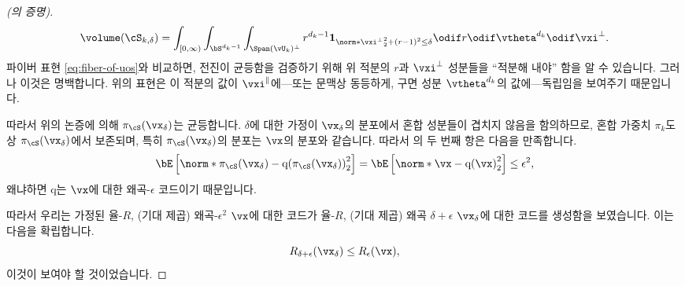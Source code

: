 \documentclass[../../book-main_ko.tex]{subfiles}
\begin{document}
\begin{proof}[(의 증명)]
    \begin{equation}
        \volume(\cS_{k, \delta})
        = \int_{[0, \infty)} \int_{\bS^{d_k-1}} \int_{\Span(\vU_k)^\perp}
        r^{d_k-1}
        \mathbf{1}_{
            \norm*{\vxi^{\perp}}_2^2
            + \left( r - 1 \right)^2
            \leq
            \delta
        }
        \odif r \odif \vtheta^{d_k} \odif \vxi^{\perp}.
    \end{equation}
    파이버 표현 \eqref{eq:fiber-of-uos}와 비교하면, 전진이 균등함을 검증하기 위해 위 적분의 \(r\)과 \(\vxi^\perp\) 성분들을 ``적분해 내야'' 함을 알 수 있습니다.
    그러나 이것은 명백합니다. 위의 표현은 이 적분의 값이 \(\vxi^\|\)에---또는 문맥상 동등하게, 구면 성분 \(\vtheta^{d_k}\)의 값에---독립임을 보여주기 때문입니다.

    따라서 위의 논증에 의해 \(\pi_{\cS}(\vx_{\delta})\)는 균등합니다.
    \(\delta\)에 대한 가정이 \(\vx_{\delta}\)의 분포에서 혼합 성분들이 겹치지 않음을 함의하므로, 혼합 가중치 \(\pi_k\)도 상 \(\pi_{\cS}(\vx_{\delta})\)에서 보존되며, 특히 \(\pi_{\cS}(\vx_{\delta})\)의 분포는 \(\vx\)의 분포와 같습니다.
    따라서 의 두 번째 항은 다음을 만족합니다.
    \begin{equation}
        \bE\left[ \norm*{ \pi_{\cS}(\vx_{\delta}) - \mathrm{q}(\pi_{\cS}(\vx_{\delta})) }_2^2 \right]
        =
        \bE\left[ \norm*{ \vx - \mathrm{q}(\vx) }_2^2 \right]
        \leq
        \epsilon^2,
    \end{equation}
    왜냐하면 \(\mathrm{q}\)는 \(\vx\)에 대한 왜곡-\(\epsilon\) 코드이기 때문입니다.

    따라서 우리는 가정된 율-\(R\), (기대 제곱) 왜곡-\(\epsilon^2\) \(\vx\)에 대한 코드가 율-\(R\), (기대 제곱) 왜곡 \(\delta + \epsilon\) \(\vx_{\delta}\)에 대한 코드를 생성함을 보였습니다.
    이는 다음을 확립합니다.
    \begin{equation}
        R_{\delta + \epsilon}(\vx_{\delta})
        \leq
        R_{\epsilon}(\vx),
    \end{equation}
    이것이 보여야 할 것이었습니다.


\end{proof}
\end{document}
